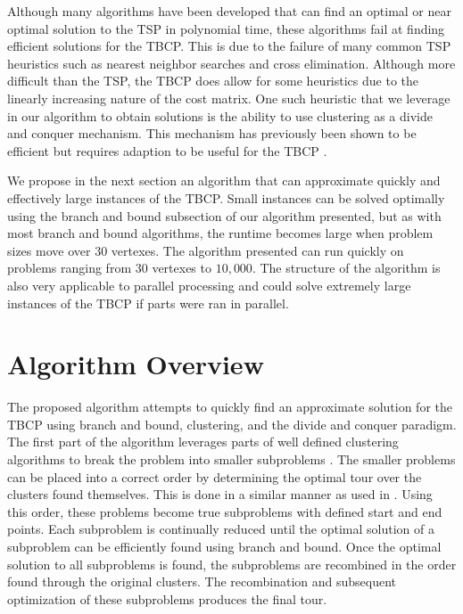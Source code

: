 \documentclass[sigconf, anonymous, pdftex]{acmart}
\begin{document}
Although many algorithms have been developed that can find an optimal or near optimal solution to the TSP in polynomial time, these algorithms fail at finding efficient solutions for the TBCP. This is due to the failure of many common TSP heuristics such as nearest neighbor searches and cross elimination. Although more difficult than the TSP, the TBCP does allow for some heuristics due to the linearly increasing nature of the cost matrix. One such heuristic that we leverage in our algorithm to obtain solutions is the ability to use clustering as a divide and conquer mechanism. This mechanism has previously been shown to be efficient but requires adaption to be useful for the TBCP \cite{dcClusteringMillionTSP}\cite{tspLargeClustering}.

We propose in the next section an algorithm that can approximate quickly and effectively large instances of the TBCP. Small instances can be solved optimally using the branch and bound subsection of our algorithm presented, but as with most branch and bound algorithms, the runtime becomes large when problem sizes move over $30$ vertexes. The algorithm presented can run quickly on problems ranging from $30$ vertexes to $10,000$. The structure of the algorithm is also very applicable to parallel processing and could solve extremely large instances of the TBCP if parts were ran in parallel. 

\section{Algorithm Overview}

The proposed algorithm attempts to quickly find an approximate solution for the TBCP using branch and bound, clustering, and the divide and conquer paradigm. The first part of the algorithm leverages parts of well defined clustering algorithms to break the problem into smaller subproblems \cite{clusteringAlgorithms}. The smaller problems can be placed into a correct order by determining the optimal tour over the clusters found themselves. This is done in a similar manner as used in \cite{tspLargeClustering}. Using this order, these problems become true subproblems with defined start and end points. Each subproblem is continually reduced until the optimal solution of a subproblem can be efficiently found using branch and bound. Once the optimal solution to all subproblems is found, the subproblems are recombined in the order found through the original clusters. The recombination and subsequent optimization of these subproblems produces the final tour.
\end{document}
